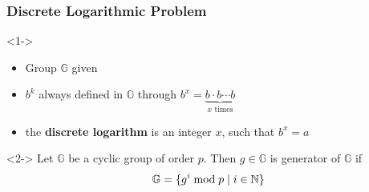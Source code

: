 \begin{frame}
	\frametitle{Discrete Logarithmic Problem}

	\begin{definition}<1->
		\begin{itemize}
			\item Group $\mathbb{G}$ given
			\item $b^k$ always defined in $\mathbb{G}$ through $b^x = \underbrace{b\cdot b \cdots b}_{x\text{ times}}$
			\item the \textbf{discrete logarithm} is an integer $x$, such that $b^x = a$
		\end{itemize}
	\end{definition}
	\begin{definition}<2->
		Let $\mathbb{G}$ be a cyclic group of order $p$. Then $g\in\mathbb{G}$ is generator of $\mathbb{G}$ if
			$$\mathbb{G} = \{g^i \bmod p \mid i \in \mathbb{N} \}$$
	\end{definition}
\end{frame}